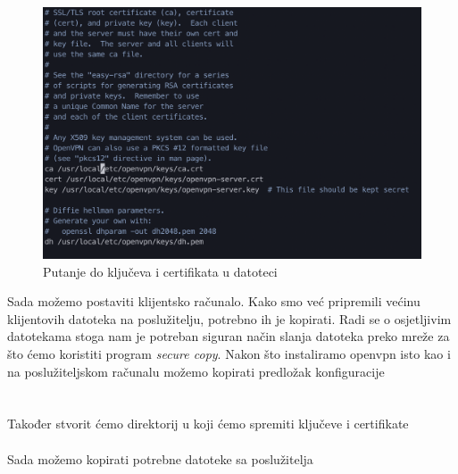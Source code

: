         \begin{figure}[H]
            \centering
            \includegraphics[scale=0.57]{slike/serverPaths}
            \caption{Putanje do ključeva i certifikata u datoteci
            }
        \end{figure}
        
        Sada možemo postaviti klijentsko računalo. Kako smo već pripremili
        većinu klijentovih datoteka na poslužitelju, potrebno ih je kopirati.
        Radi se o osjetljivim datotekama stoga nam je potreban siguran način
        slanja datoteka preko mreže za što ćemo koristiti program
        \textit{secure copy}. Nakon što instaliramo openvpn isto kao i na
        poslužiteljskom računalu možemo kopirati predložak konfiguracije \\

        \noindent
         \\
         \\

        \noindent
        Također stvorit ćemo direktorij u koji ćemo spremiti ključeve i
        certifikate \\

        \noindent
        \\

        \noindent
        Sada možemo kopirati potrebne datoteke sa poslužitelja \\

